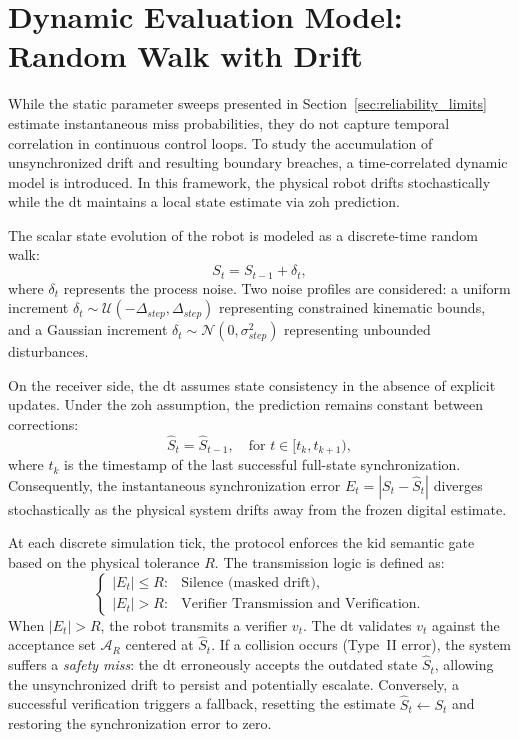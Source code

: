 \section{Dynamic Evaluation Model: Random Walk with Drift}
\label{sec:random_walk_model}

While the static parameter sweeps presented in Section~\ref{sec:reliability_limits} estimate instantaneous miss probabilities, they do not capture temporal correlation in continuous control loops. To study the accumulation of unsynchronized drift and resulting boundary breaches, a time-correlated dynamic model is introduced. In this framework, the physical robot drifts stochastically while the \gls{dt} maintains a local state estimate via \gls{zoh} prediction.

The scalar state evolution of the robot is modeled as a discrete-time random walk:
\begin{equation}
    S_t = S_{t-1} + \delta_t,
\end{equation}
where $\delta_t$ represents the process noise. Two noise profiles are considered: a uniform increment $\delta_t \sim \mathcal{U}(-\Delta_{step}, \Delta_{step})$ representing constrained kinematic bounds, and a Gaussian increment $\delta_t \sim \mathcal{N}(0, \sigma_{step}^2)$ representing unbounded disturbances.

On the receiver side, the \gls{dt} assumes state consistency in the absence of explicit updates. Under the \gls{zoh} assumption, the prediction remains constant between corrections:
\begin{equation}
    \hat{S}_t = \hat{S}_{t-1}, \quad \text{for } t \in [t_k, t_{k+1}),
\end{equation}
where $t_k$ is the timestamp of the last successful full-state synchronization. Consequently, the instantaneous synchronization error $E_t = |S_t - \hat{S}_t|$ diverges stochastically as the physical system drifts away from the frozen digital estimate.



At each discrete simulation tick, the protocol enforces the \gls{kid} semantic gate based on the physical tolerance $R$. The transmission logic is defined as:
\begin{equation}
    \begin{cases}
        |E_t| \le R: & \text{Silence (masked drift),} \\
        |E_t| > R: & \text{Verifier Transmission and Verification.}
    \end{cases}
\end{equation}
When $|E_t| > R$, the robot transmits a verifier $v_t$. The \gls{dt} validates $v_t$ against the acceptance set $\mathcal{A}_R$ centered at $\hat{S}_t$. If a collision occurs (Type~II error), the system suffers a \textit{safety miss}: the \gls{dt} erroneously accepts the outdated state $\hat{S}_t$, allowing the unsynchronized drift to persist and potentially escalate. Conversely, a successful verification triggers a fallback, resetting the estimate $\hat{S}_t \leftarrow S_t$ and restoring the synchronization error to zero.

